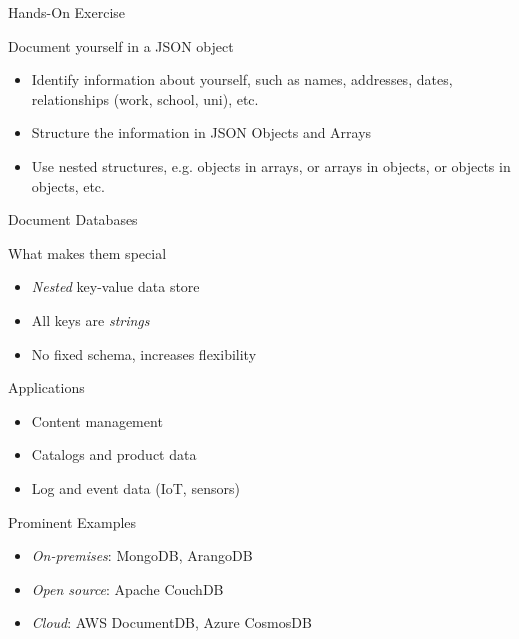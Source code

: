 \documentclass[ignorenonframetext,xcolor=x11names]{beamer}
\begin{document}
\begin{frame}{Hands-On Exercise}
\begin{block}{Document yourself in a JSON object}
\begin{itemize}
	\item Identify information about yourself, such as names, addresses, dates, relationships (work, school, uni), etc.
	\item Structure the information in JSON Objects and Arrays 
	\item Use nested structures, e.g. objects in arrays, or arrays in objects, or objects in objects, etc.
\end{itemize}
\end{block}
\end{frame}

\begin{frame}[allowframebreaks]{Document Databases}
\begin{block}{What makes them special}
\begin{itemize}
	\item \emph{Nested} key-value data store
	\item All keys are \emph{strings}
	\item No fixed schema, increases flexibility
\end{itemize}
\end{block}

\begin{block}{Applications}
\begin{itemize}
	\item Content management
	\item Catalogs and product data
	\item Log and event data (IoT, sensors)
\end{itemize}
\end{block}

\begin{block}{Prominent Examples}
\begin{itemize}
	\item \emph{On-premises}: MongoDB, ArangoDB
	\item \emph{Open source}: Apache CouchDB
	\item \emph{Cloud}: AWS DocumentDB, Azure CosmosDB
\end{itemize}
\end{block}
\end{frame}
\end{document}
